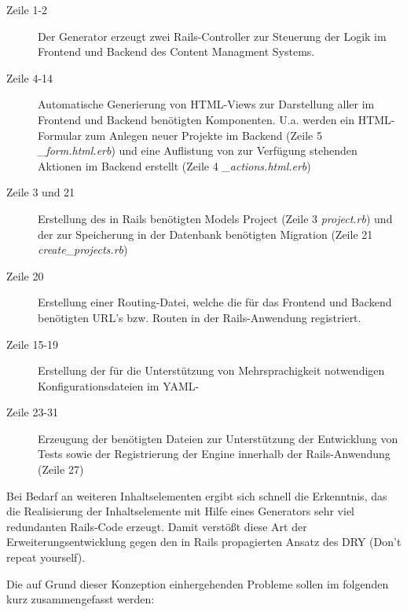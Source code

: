 \begin{description}
\item[Zeile 1-2]
Der Generator erzeugt zwei Rails-Controller zur Steuerung der Logik im Frontend und Backend des Content Managment Systems.
\item[Zeile 4-14]
Automatische Generierung von HTML-Views zur Darstellung aller im Frontend und Backend benötigten Komponenten. U.a. werden ein HTML-Formular zum Anlegen neuer Projekte im Backend (Zeile 5 \emph{\_form.html.erb}) und eine Auflistung von zur Verfügung stehenden Aktionen im Backend erstellt (Zeile 4 \emph{\_actions.html.erb})
\item[Zeile 3 und 21]
Erstellung des in Rails benötigten Models Project (Zeile 3 \emph{project.rb}) und der zur Speicherung in der Datenbank benötigten Migration (Zeile 21 \emph{create\_projects.rb})
\item[Zeile 20]
Erstellung einer Routing-Datei, welche die für das Frontend und Backend benötigten URL's bzw. Routen in der Rails-Anwendung registriert.
\item[Zeile 15-19]
Erstellung der für die Unterstützung von Mehrsprachigkeit notwendigen Konfigurationsdateien im YAML-
\item[Zeile 23-31]
Erzeugung der benötigten Dateien zur Unterstützung der Entwicklung von Tests sowie der Registrierung der Engine innerhalb der Rails-Anwendung (Zeile 27)
\end{description}



Bei Bedarf an weiteren Inhaltselementen ergibt sich schnell die Erkenntnis, das die Realisierung der Inhaltselemente mit Hilfe eines Generators sehr viel redundanten Rails-Code erzeugt. Damit verstößt diese Art der Erweiterungsentwicklung gegen den in Rails propagierten Ansatz des DRY (Don't repeat yourself).

Die auf Grund dieser Konzeption einhergehenden Probleme sollen im folgenden kurz zusammengefasst werden:


